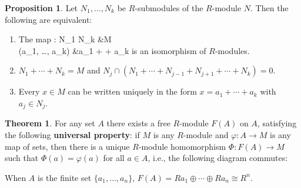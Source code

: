 \documentclass[12pt]{article}
\newcommand{\keyword}[1]{\textbf{#1}}
\def\[#1\]{\begin{align*}#1\end{align*}}
\theoremstyle{definition}
\newtheorem{theorem}{Theorem}
\newtheorem{proposition}{Proposition}
\renewcommand{\phi}{\varphi}
\newcommand{\<}{\left\langle}
\renewcommand{\>}{\right\rangle}
\newcommand{\isom}{\cong}
\newcommand{\dsum}{\oplus}
\begin{document}
\begin{proposition}
    Let $N_1, \dots, N_k$ be $R$-submodules of the $R$-module $N$. Then the following are equivalent:
    \begin{enumerate}[(1)]
        \item The map
        \[
            \pi : N_1 \times \cdots \times N_k &\to M \\
                (a_1, \dots, a_k) &\mapsto a_1 + \cdots + a_k
        \]
        is an isomorphism of $R$-modules.
        
        \item $N_1 + \cdots + N_k = M$ and $N_j \cap (N_1 + \cdots + N_{j-1} + N_{j+1} + \cdots + N_k) = 0$.
        
        \item Every $x \in M$ can be written uniquely in the form $x = a_1 + \cdots + a_k$ with $a_j \in N_j$.
    \end{enumerate}
\end{proposition}

\newpage
\begin{theorem}
    For any set $A$ there exists a free $R$-module $F(A)$ on $A$, satisfying the following \keyword{universal property}: if $M$ is any $R$-module and $\phi : A \to M$ is any map of sets, then there is a unique $R$-module homomorphism $\Phi : F(A) \to M$ such that $\Phi(a) = \phi(a)$ for all $a \in A$, i.e., the following diagram commutes:
    \begin{center}
    \end{center}
    \begin{center}
    \end{center}
    \begin{center}
    \end{center}
    When $A$ is the finite set $\{a_1, \dots, a_n\}$, $F(A) = Ra_1 \dsum \cdots \dsum Ra_n \isom R^n$.
\end{theorem}
\end{document}
